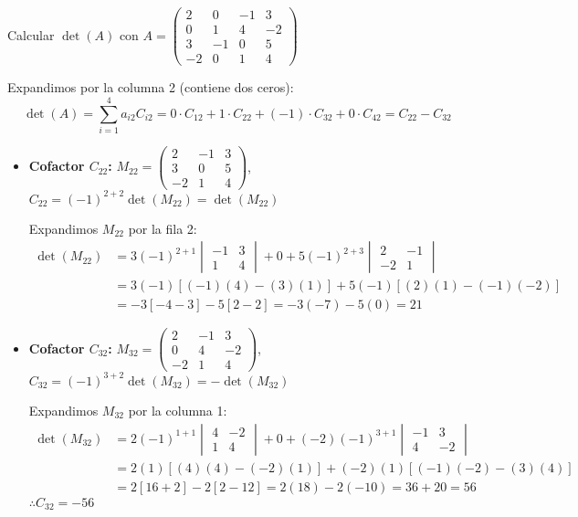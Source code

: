 \begin{example}
\label{ex:det4x4}
Calcular $\det(A)$ con $A = \begin{pmatrix}
2 & 0 & -1 & 3 \\
0 & 1 & 4 & -2 \\
3 & -1 & 0 & 5 \\
-2 & 0 & 1 & 4
\end{pmatrix}$

\begin{myproof}
Expandimos por la columna 2 (contiene dos ceros):
\[
\det(A) = \sum_{i=1}^{4} a_{i2} C_{i2} = 0 \cdot C_{12} + 1 \cdot C_{22} + (-1) \cdot C_{32} + 0 \cdot C_{42} = C_{22} - C_{32}
\]

\begin{itemize}
\item \textbf{Cofactor $C_{22}$:} 
$M_{22} = \begin{pmatrix} 2 & -1 & 3 \\ 3 & 0 & 5 \\ -2 & 1 & 4 \end{pmatrix}$, 
$C_{22} = (-1)^{2+2} \det(M_{22}) = \det(M_{22})$

Expandimos $M_{22}$ por la fila 2:
\begin{align*}
\det(M_{22}) &= 3(-1)^{2+1} \begin{vmatrix} -1 & 3 \\ 1 & 4 \end{vmatrix} + 0 + 5(-1)^{2+3} \begin{vmatrix} 2 & -1 \\ -2 & 1 \end{vmatrix} \\
&= 3(-1)[(-1)(4) - (3)(1)] + 5(-1)[(2)(1) - (-1)(-2)] \\
&= -3[-4-3] - 5[2-2] = -3(-7) - 5(0) = 21
\end{align*}

\item \textbf{Cofactor $C_{32}$:} 
$M_{32} = \begin{pmatrix} 2 & -1 & 3 \\ 0 & 4 & -2 \\ -2 & 1 & 4 \end{pmatrix}$, 
$C_{32} = (-1)^{3+2} \det(M_{32}) = -\det(M_{32})$

Expandimos $M_{32}$ por la columna 1:
\begin{align*}
\det(M_{32}) &= 2(-1)^{1+1} \begin{vmatrix} 4 & -2 \\ 1 & 4 \end{vmatrix} + 0 + (-2)(-1)^{3+1} \begin{vmatrix} -1 & 3 \\ 4 & -2 \end{vmatrix} \\
&= 2(1)[(4)(4) - (-2)(1)] + (-2)(1)[(-1)(-2) - (3)(4)] \\
&= 2[16+2] - 2[2-12] = 2(18) - 2(-10) = 36 + 20 = 56
\end{align*}
$\therefore C_{32} = -56$
\end{itemize}


\end{myproof}
\end{example}
